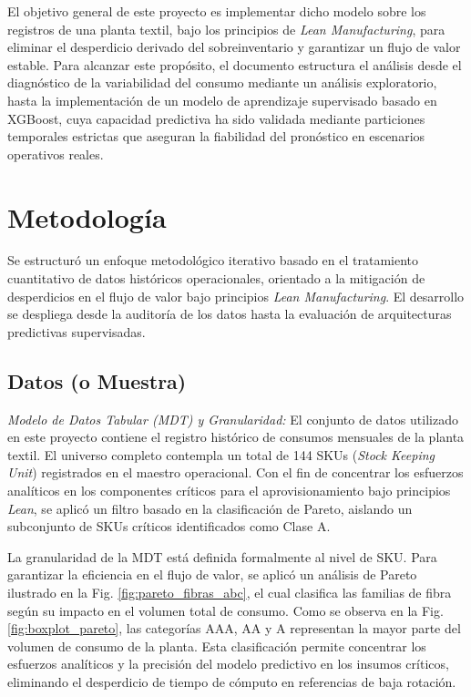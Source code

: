 \documentclass[conference,twoside]{IEEEtran}
\begin{document}
El objetivo general de este proyecto es implementar dicho modelo sobre los registros de una planta textil, bajo los principios de \textit{Lean Manufacturing}, para eliminar el desperdicio derivado del sobreinventario y garantizar un flujo de valor estable. Para alcanzar este propósito, el documento estructura el análisis desde el diagnóstico de la variabilidad del consumo mediante un análisis exploratorio, hasta la implementación de un modelo de aprendizaje supervisado basado en XGBoost, cuya capacidad predictiva ha sido validada mediante particiones temporales estrictas que aseguran la fiabilidad del pronóstico en escenarios operativos reales.








\section{Metodología}

\label{sec:metodos}

Se estructuró un enfoque metodológico iterativo basado en el tratamiento cuantitativo de datos históricos operacionales, orientado a la mitigación de desperdicios en el flujo de valor bajo principios \textit{Lean Manufacturing}. El desarrollo se despliega desde la auditoría de los datos hasta la evaluación de arquitecturas predictivas supervisadas.

\subsection{Datos (o Muestra)}
\label{subsec:datos}

\textit{Modelo de Datos Tabular (MDT) y Granularidad:} El conjunto de datos utilizado en este proyecto contiene el registro histórico de consumos mensuales de la planta textil. El universo completo contempla un total de 144 SKUs (\textit{Stock Keeping Unit}) registrados en el maestro operacional. Con el fin de concentrar los esfuerzos analíticos en los componentes críticos para el aprovisionamiento bajo principios \textit{Lean}, se aplicó un filtro basado en la clasificación de Pareto, aislando un subconjunto de SKUs críticos identificados como Clase A.

La granularidad de la MDT está definida formalmente al nivel de SKU. Para garantizar la eficiencia en el flujo de valor, se aplicó un análisis de Pareto ilustrado en la Fig. \ref{fig:pareto_fibras_abc}, el cual clasifica las familias de fibra según su impacto en el volumen total de consumo. Como se observa en la Fig. \ref{fig:boxplot_pareto}, las categorías AAA, AA y A representan la mayor parte del volumen de consumo de la planta. Esta clasificación permite concentrar los esfuerzos analíticos y la precisión del modelo predictivo en los insumos críticos, eliminando el desperdicio de tiempo de cómputo en referencias de baja rotación.
\end{document}
